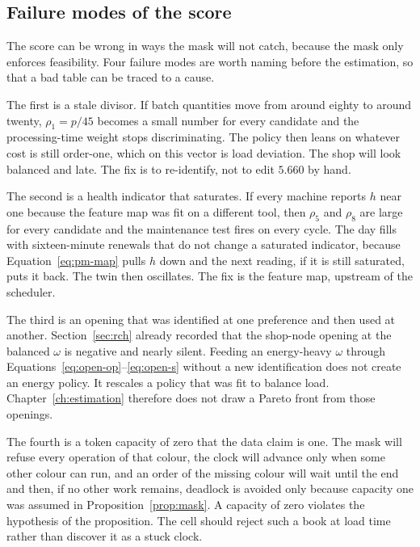 \subsection{Failure modes of the score}

The score can be wrong in ways the mask will not catch, because the mask only enforces feasibility. Four failure modes are worth naming before the estimation, so that a bad table can be traced to a cause.

The first is a stale divisor. If batch quantities move from around eighty to around twenty, \(\rho_1 = p/45\) becomes a small number for every candidate and the processing-time weight stops discriminating. The policy then leans on whatever cost is still order-one, which on this vector is load deviation. The shop will look balanced and late. The fix is to re-identify, not to edit \(5.660\) by hand.

The second is a health indicator that saturates. If every machine reports \(h\) near one because the feature map was fit on a different tool, then \(\rho_5\) and \(\rho_8\) are large for every candidate and the maintenance test fires on every cycle. The day fills with sixteen-minute renewals that do not change a saturated indicator, because Equation~\eqref{eq:pm-map} pulls \(h\) down and the next reading, if it is still saturated, puts it back. The twin then oscillates. The fix is the feature map, upstream of the scheduler.

The third is an opening that was identified at one preference and then used at another. Section~\ref{sec:rch} already recorded that the shop-node opening at the balanced \(\omega\) is negative and nearly silent. Feeding an energy-heavy \(\omega\) through Equations~\eqref{eq:open-op}--\eqref{eq:open-s} without a new identification does not create an energy policy. It rescales a policy that was fit to balance load. Chapter~\ref{ch:estimation} therefore does not draw a Pareto front from those openings.

The fourth is a token capacity of zero that the data claim is one. The mask will refuse every operation of that colour, the clock will advance only when some other colour can run, and an order of the missing colour will wait until the end and then, if no other work remains, deadlock is avoided only because capacity one was assumed in Proposition~\ref{prop:mask}. A capacity of zero violates the hypothesis of the proposition. The cell should reject such a book at load time rather than discover it as a stuck clock.

